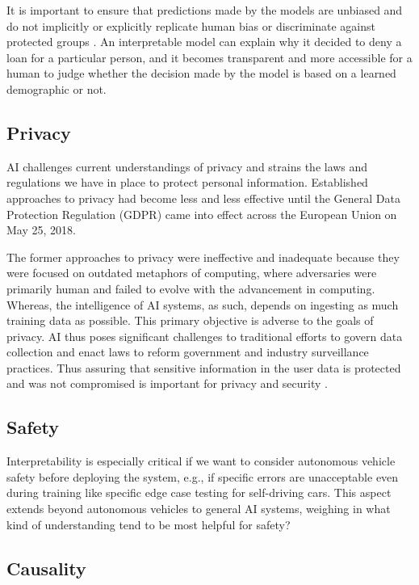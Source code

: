 It is important to ensure that predictions made by the models are unbiased and do not implicitly or explicitly replicate human bias or discriminate against protected groups \cite{ainow2016report}. An interpretable model can explain why it decided to deny a loan for a particular person, and it becomes transparent and more accessible for a human to judge whether the decision made by the model is based on a learned demographic or not.

\subsection{Privacy}

AI challenges current understandings of privacy and strains the laws and regulations we have in place to protect personal information. Established approaches to privacy had become less and less effective until the General Data Protection Regulation (GDPR) came into effect across the European Union on May 25, 2018.

The former approaches to privacy were ineffective and inadequate because they were focused on outdated metaphors of computing, where adversaries were primarily human and failed to evolve with the advancement in computing. Whereas, the intelligence of AI systems, as such, depends on ingesting as much training data as possible. This primary objective is adverse to the goals of privacy. AI thus poses significant challenges to traditional efforts to govern data collection and enact laws to reform government and industry surveillance practices. Thus assuring that sensitive information in the user data is protected and was not compromised is important for privacy and security \cite{molnar}. 

\subsection{Safety}

Interpretability is especially critical if we want to consider autonomous vehicle \cite{shannon_mattern} safety before deploying the system, e.g., if specific errors are unacceptable even during training like specific edge case testing for self-driving cars. This aspect extends beyond autonomous vehicles to general AI systems, weighing in what kind of understanding tend to be most helpful for safety?

\subsection*{Causality}

